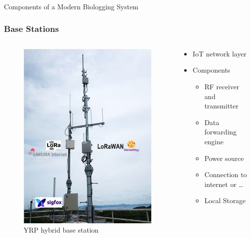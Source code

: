 \documentclass{beamer}
\begin{document}
  \begin{frame}{Components of a Modern Biologging System}
    \frametitle{Base Stations}
    \begin{columns}
      \begin{column}{0.4\textwidth}
        \begin{figure}[htbp]
          \centering
          \includegraphics[height=.7\textheight]{BaseStation.jpg}
          \caption{YRP hybrid base station \cite{miyajima_2020}}
          \label{fig:LPWAN_Base_Station}
        \end{figure}
      \end{column}
      \begin{column}{0.6\textwidth}
        \begin{itemize}
          \item IoT network layer
          \item Components
          \begin{itemize}
            \item RF receiver and transmitter
            \item Data forwarding engine
            \item Power source
            \item Connection to internet or \ldots
            \item Local Storage
          \end{itemize}
        \end{itemize}
      \end{column}
    \end{columns}
  \end{frame}
\end{document}
